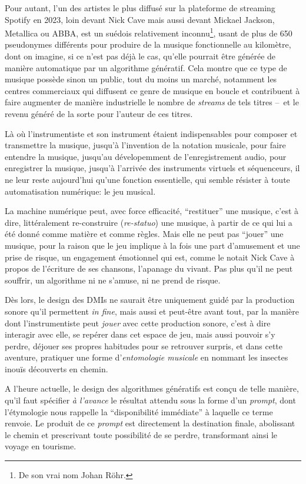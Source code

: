 Pour autant, l'un des artistes le plus diffusé sur la plateforme de streaming Spotify en 2023, loin devant Nick Cave mais aussi devant Mickael Jackson, Metallica ou ABBA, est un suédois relativement inconnu\footnote{De son vrai nom Johan Röhr.}, usant de plus de 650 pseudonymes différents pour produire de la musique fonctionnelle au kilomètre, dont on imagine, si ce n'est pas déjà le cas, qu'elle pourrait être générée de manière automatique par un algorithme génératif. Cela montre que ce type de musique possède sinon un public, tout du moins un marché, notamment les centres commerciaux qui diffusent ce genre de musique en boucle et contribuent à faire augmenter de manière industrielle le nombre de \textit{streams} de tels titres --~et le revenu généré de la sorte pour l'auteur de ces titres.


Là où l'instrumentiste et son instrument étaient indispensables pour composer et transmettre la musique, jusqu'à l'invention de la notation musicale, pour faire entendre la musique, jusqu'au dévelopemment de l'enregistrement audio, pour enregistrer la musique, jusqu'à l'arrivée des instruments virtuels et séquenceurs, il ne leur reste aujourd'hui qu'une fonction essentielle, qui semble résister à toute automatisation numérique: le jeu musical.


La machine numérique peut, avec force efficacité, ``restituer'' une musique, c'est à dire, littéralement re-construire (\textit{re-statuo}) une musique, à partir de ce qui lui a été donné comme matière et comme règles.
Mais elle ne peut pas ``jouer'' une musique, pour la raison que le jeu implique à la fois une part d'amusement et une prise de risque, un engagement émotionnel qui est, comme le notait Nick Cave à propos de l'écriture de ses chansons, l'apanage du vivant. Pas plus qu'il ne peut souffrir, un algorithme ni ne s'amuse, ni ne prend de risque.

Dès lors, le design des \glspl{DMI} ne saurait être uniquement guidé par la production sonore qu'il permettent \textit{in fine}, mais aussi et peut-être avant tout, par la manière dont l'instrumentiste peut \textit{jouer} avec cette production sonore, c'est à dire interagir avec elle, se repérer dans cet espace de jeu, mais aussi pouvoir s'y perdre, déjouer ses propres habitudes pour se retrouver surpris, et dans cette aventure, pratiquer une forme d'\textit{entomologie musicale} en nommant les insectes inouïs découverts en chemin.

A l'heure actuelle, le design des algorithmes génératifs est conçu de telle manière, qu'il faut spécifier \textit{à l'avance} le résultat attendu sous la forme d'un \textit{prompt}, dont l'étymologie nous rappelle la ``disponibilité immédiate'' à laquelle ce terme renvoie. Le produit de ce \textit{prompt} est directement la destination finale, abolissant le chemin et prescrivant toute possibilité de se perdre, transformant ainsi le voyage en tourisme.


